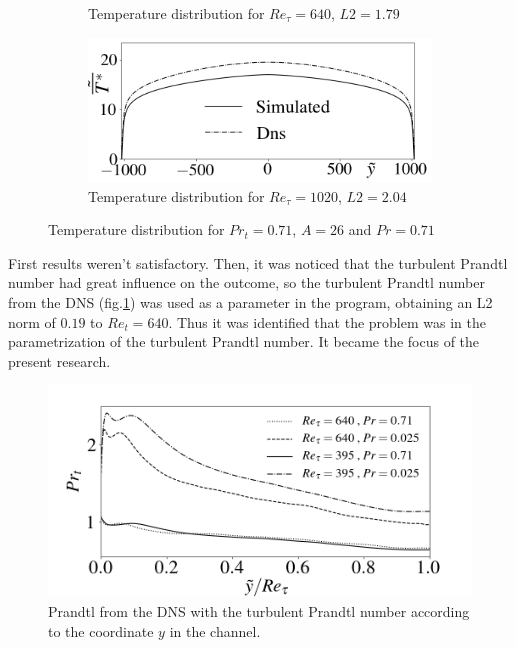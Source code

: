 \documentclass[10pt]{article} %
\begin{document}
\begin{figure}[h!]
\begin{subfigure}[t]{0.49\textwidth}
		\caption{Temperature distribution for $Re_\tau = 640$, $L2 = 1.79$}
		\end{subfigure}%
		\begin{subfigure}[t]{0.49\textwidth}
		\centering
		\includegraphics[angle=0, scale=0.28]{fotos_formatacao_final/Temperature_1000_071_classico}
		\caption{Temperature distribution for $Re_\tau = 1020$, $L2 = 2.04$}
		\end{subfigure}%
		\caption{Temperature distribution for $Pr_t = 0.71$, $A = 26$ and $Pr = 0.71$} 
	\end{figure}	

First results weren't satisfactory. Then, it was noticed that the turbulent Prandtl number had great influence on the outcome, so the turbulent Prandtl number from the DNS (fig.\ref{figure5}) was used as a parameter in the program, obtaining an L2 norm of $ 0.19 $ to $ Re_t = 640 $. Thus it was identified that the problem was in the parametrization of the turbulent Prandtl number. It became the focus of the present research.

\begin{figure}[h!]
	\centering
	\includegraphics[angle=0, scale=0.55]{fotos_formatacao_final/DNS_PRt}
	\caption{Prandtl from the DNS with the turbulent Prandtl number according to the coordinate $ y $ in the channel.}
	\label{figure5}
\end{figure}
\end{document}
